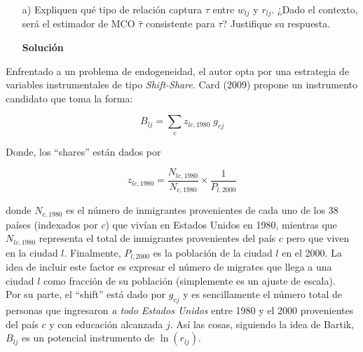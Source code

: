 \documentclass[a4paper, answers, addpoints, 11pt]{exam}
\newenvironment{solucion}{%
  \begin{mdframed}[
    backgroundcolor=blue!5,    %
    linecolor=blue!50,          %
    linewidth=2pt,              %
    leftmargin=10pt,            %
    rightmargin=8pt,           %
    topline=true,              %
    bottomline=true,            %
    roundcorner=10pt,           %
    innerleftmargin=10pt,       %
    innerrightmargin=10pt,      %
    innerbottommargin=10pt,     %
    innertopmargin=10pt         %
  ]%
  \begin{tcolorbox}[colframe=blue!50!black, colback=blue!50, coltitle=white, sharp corners=all, boxrule=1mm, width=\textwidth, halign=left, valign=center, top=0mm, bottom=0mm, left=0mm, right=0mm] \textbf{Solución} \end{tcolorbox} }{\end{mdframed}}
\begin{document}
 
\begin{itemize}

   

    \item[a)] Expliquen qué tipo de relación captura $\tau$ entre $w_{lj}$ y $r_{lj}$. ¿Dado el contexto, será el estimador de MCO $\hat{\tau}$ consistente para $\tau$? Justifique su respuesta.\\
    \begin{solucion}
\end{solucion}
\end{itemize}   

Enfrentado a un problema de endogeneidad, el autor opta por una estrategia de variables instrumentales de tipo \textit{Shift-Share}. Card (2009) propone un instrumento candidato que toma la forma:

$$B_{lj}=\sum_c z_{lc,1980} \; g_{cj}$$

Donde, los ``shares'' están dados por 

$$z_{lc,1980}=\dfrac{N_{lc,1980}}{N_{c,1980}} \times \dfrac{1}{P_{l,2000}}$$

donde $N_{c,1980}$ es el número de inmigrantes provenientes de cada uno de los 38 países (indexados por $c$) que vivían en Estados Unidos en 1980, mientras que $N_{lc,1980}$ representa el total de inmigrantes provenientes del país $c$ pero que viven en la ciudad $l$. Finalmente, $P_{l,2000}$ es la población de la ciudad $l$ en el 2000. La idea de incluir este factor es expresar el número de migrates que llega a una ciudad $l$ como fracción de su población (simplemente es un ajuste de escala).\\

Por su parte, el ``shift'' está dado por $g_{cj}$ y es sencillamente el número total de personas que ingresaron \textit{a todo Estados Unidos} entre 1980 y el 2000 provenientes del país $c$ y con educación alcanzada $j$. Así las cosas, siguiendo la idea de Bartik, $B_{lj}$ es un potencial instrumento de $\ln(r_{lj})$.\\
\end{document}
